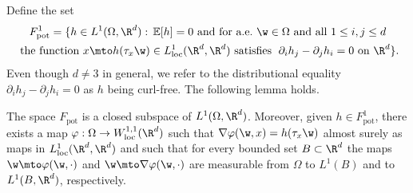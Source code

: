 Define the set\vspace*{-5pt}
\begin{multline}\label{eq:def_F_pot}
F_\mathrm{pot}^1=\{h\in L^1(\Omega,\R^d):\,\mathbb{E}[h]=0\text{ and for a.e.\ }\w\in\Omega \text{ and all }1\leq i,j\leq d
\\
\text{ the function }x\mto h(\tau_x\w)\in L^1_\mathrm{loc}(\R^d,\R^d)\text{ satisfies }\;\partial_i h_j-\partial_j h_i=0 \text{ on }\R^d\}.
\end{multline}
Even though $d\neq 3$ in general, we refer to the distributional equality $\partial_i h_j-\partial_j h_i=0$ as $h$ being curl-free. The following lemma holds.
\begin{lemma}\label{l.F_pot}
The space $F_\mathrm{pot}$ is a closed subspace of $L^1(\Omega,\R^d)$. Moreover, given $h\in F_\mathrm{pot}^1$, there exists a map $\varphi:\Omega\to W^{1,1}_\mathrm{loc}(\R^d)$ such that $\nabla\varphi(\w,x)=h(\tau_x\w)$ almost surely as maps in $L^1_\mathrm{loc}(\R^d,\R^d)$ and such that for every bounded set $B\subset\R^d$ the maps $\w\mto \varphi(\w,\cdot)$ and $\w\mto \nabla\varphi(\w,\cdot)$ are measurable from $\Omega$ to $L^1(B)$ and to $L^1(B,\R^d)$, respectively.
\end{lemma}
